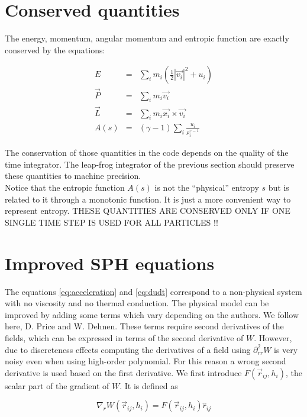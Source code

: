 \documentclass[a4paper,10pt]{article}
\begin{document}
\section{Conserved quantities}

The energy, momentum, angular momentum and entropic function are exactly conserved by the equations:

\begin{eqnarray}
E &=&\sum_i m_i\left(\frac{1}{2}|\vec{v_i}|^2+u_i\right)\\
\vec{P} &=&\sum_i m_i \vec{v_i}\\
\vec{L} &=& \sum_i m_i \vec{x_i} \times \vec{v_i}\\ 
A(s) &=& \left(\gamma -1 \right)\sum_i \frac{u_i}{\rho_i^{\gamma - 1}}
\end{eqnarray}

The conservation of those quantities in the code depends on the quality of the time integrator. The leap-frog
integrator of the previous section should preserve these quantities to machine precision.\\
Notice that the entropic function $A(s)$ is not the ``physical'' entropy $s$ but is related to it through a monotonic
function. It is just a more convenient way to represent entropy.
THESE QUANTITIES ARE CONSERVED ONLY IF ONE SINGLE TIME STEP IS USED FOR ALL PARTICLES !!


\section{Improved SPH equations}

The equations \ref{eq:acceleration} and \ref{eq:dudt} correspond to a non-physical system with no viscosity and no
thermal conduction. The physical model can be improved by adding some terms which vary depending on the authors. We
follow here, D. Price and W. Dehnen.
These terms require second derivatives of the fields, which can be expressed in terms of the second derivative of $W$.
However, due to discreteness effects computing the derivatives of a field using $\partial^2_{rr}W$ is very noisy even
when using high-order polynomial. For this reason a wrong second derivative is used based on the first derivative. We
first introduce $F(\vec{r}_{ij},h_i)$, the scalar part of the gradient of $W$. It is defined as

\begin{equation}
 \nabla_r W(\vec{r}_{ij},h_i) = F(\vec{r}_{ij},h_i) \hat{r}_{ij}
\end{equation}
\end{document}
